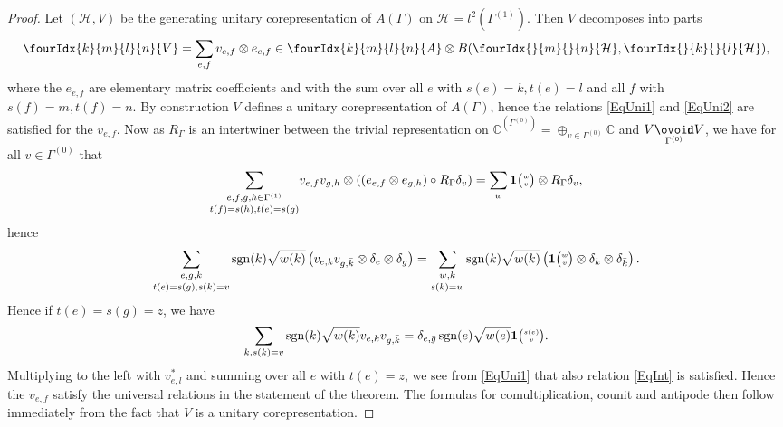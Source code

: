 \documentclass[11pt]{article}
\DeclareMathOperator{\sgn}{\mathrm{sgn}}
\newcommand{\Circtv}[1]{\underset{#1}{\mathop{\ooalign{$\ovoid$\cr\hidewidth\raise-.05ex\hbox{$\scriptstyle\mathsf T\mkern3.5mu$}\cr}}}} %
\newcommand{\C}{\mathbb{C}}
\newcommand{\Hsp}{\mathcal{H}}
\newcommand{\Grt}[3]{#1{\tiny {\begin{pmatrix} #2\\#3\end{pmatrix}}}}
\newcommand{\UnitC}[2]{\Grt{\mathbf{1}}{#1}{#2}}
\newcommand{\Gr}[5]{\fourIdx{#2}{#4}{#3}{#5}{#1}}%
\newcommand{\Gru}[3]{\Gr{#1}{}{}{#2}{#3}}
\theoremstyle{definition}
\numberwithin{equation}{section}
\begin{document}
\begin{proof} Let $(\Hsp,V)$ be the generating unitary corepresentation of $A(\Gamma)$ on $\Hsp = l^2(\Gamma^{(1)})$. Then $V$ decomposes into parts \[ \Gr{V}{k}{l}{m}{n} = \sum_{e,f} v_{e,f} \otimes e_{e,f} \in \Gr{A}{k}{l}{m}{n}\otimes B(\Gru{\Hsp}{m}{n},\Gru{\Hsp}{k}{l}),\] where the $e_{e,f}$ are elementary matrix coefficients and with the sum over all $e$ with $s(e)=k,t(e)=l$ and all $f$ with $s(f) = m, t(f)=n$. By construction $V$ defines a unitary corepresentation of $A(\Gamma)$, hence the relations \eqref{EqUni1} and \eqref{EqUni2} are satisfied for the $v_{e,f}$. Now as $R_{\Gamma}$ is an intertwiner between the trivial representation on $\C^{(\Gamma^{(0)})} = \oplus_{v\in \Gamma^{(0)}} \C$ and $V\Circtv{\Gamma^{(0)}} V$, we have for all $v\in \Gamma^{(0)}$ that \begin{equation}\label{EqMorR}\underset{t(f)=s(h),t(e)=s(g)}{\sum_{e,f,g,h\in \Gamma^{(1)}}} v_{e,f}v_{g,h}\otimes \left((e_{e,f}\otimes e_{g,h})\circ R_{\Gamma} \delta_v\right) = \sum_w \UnitC{w}{v}\otimes R_{\Gamma}\delta_v,\end{equation} hence
\[\underset{t(e)=s(g),s(k)=v}{\sum_{e,g,k}} \sgn(k)\sqrt{w(k)}\left( v_{e,k}v_{g,\bar{k}} \otimes \delta_e\otimes \delta_{g}\right) =\underset{s(k)=w}{\sum_{w,k}}\sgn(k)\sqrt{w(k)} \left(\UnitC{w}{v} \otimes \delta_k\otimes \delta_{\bar{k}}\right).\] Hence if $t(e) = s(g)=z$, we have \[\sum_{k,s(k)=v} \sgn(k)\sqrt{w(k)} v_{e,k}v_{g,\bar{k}} =  \delta_{e,\bar{g}} \sgn(e)\sqrt{w(e)}\UnitC{s(e)}{v}.\] Multiplying to the left with $v_{e,l}^*$ and summing over all $e$ with $t(e) = z$, we see from \eqref{EqUni1} that also relation \eqref{EqInt} is satisfied. Hence the $v_{e,f}$ satisfy the universal relations in the statement of the theorem. The formulas for comultiplication, counit and antipode then follow immediately from the fact that $V$ is a unitary corepresentation.


\end{proof}
\end{document}
